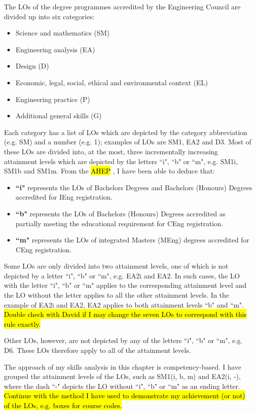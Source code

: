The LOs of the degree programmes accredited by the Engineering Council are divided up into six categories:
\begin{itemize}
    \item Science and mathematics (SM)
    \item Engineering analysis (EA)
    \item Design (D)
    \item Economic, legal, social, ethical and environmental context (EL)
    \item Engineering practice (P)
    \item Additional general skills (G)
\end{itemize}
Each category has a list of LOs which are depicted by the category abbreviation (e.g. SM) and a number (e.g. 1); examples of LOs are SM1, EA2 and D3.
Most of these LOs are divided into, at the most, three incrementally increasing attainment levels which are depicted by the letters ``i", ``b" or ``m", e.g. SM1i, SM1b and SM1m.
From the \hl{AHEP} \citep{}, I have been able to deduce that:
\begin{itemize}
    \item \textbf{``i"} represents the LOs of Bachelors Degrees and Bachelors (Honours) Degrees accredited for IEng registration.
    \item \textbf{``b"} represents the LOs of Bachelors (Honours) Degrees accredited as partially meeting the educational requirement for CEng registration.
    \item \textbf{``m"} represents the LOs of integrated Masters (MEng) degrees accredited for CEng registration.
\end{itemize}

Some LOs are only divided into two attainment levels, one of which is not depicted by a letter ``i", ``b" or ``m", e.g. EA2i and EA2.
In such cases, the LO with the letter ``i", ``b" or ``m" applies to the corresponding attainment level and the LO without the letter applies to all the other attainment levels.
In the example of EA2i and EA2, EA2 applies to both attainment levels ``b" and ``m".
\hl{Double check with David if I may change the seven LOs to correspond with this rule exactly.}

Other LOs, however, are not depicted by any of the letters ``i", ``b" or ``m", e.g. D6.
These LOs therefore apply to all of the attainment levels.

The approach of my skills analysis in this chapter is competency-based.
I have grouped the attainment levels of the LOs, such as SM1(i, b, m) and EA2(i, -), where the dash ``-" depicts the LO without ``i", ``b" or ``m" as an ending letter.
\hl{Continue with the method I have used to demonstrate my achievement (or not) of the LOs, e.g. boxes for course codes.}

